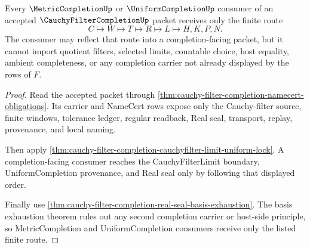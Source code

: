 \begin{theorem}
\label{thm:cauchy-filter-completion-completion-reflector-consumer}
Every $\MetricCompletionUp$ or $\UniformCompletionUp$ consumer of an accepted $\CauchyFilterCompletionUp$ packet receives only the finite route
$$
C \longmapsto W \longmapsto T \longmapsto R \longmapsto L \longmapsto H,K,P,N .
$$
The consumer may reflect that route into a completion-facing packet, but it cannot import quotient filters, selected limits, countable choice, host equality, ambient completeness, or any completion carrier not already displayed by the rows of $F$.
\end{theorem}
\begin{proof}
Read the accepted packet through \autoref{thm:cauchy-filter-completion-namecert-obligations}. Its carrier and NameCert rows expose only the Cauchy-filter source, finite windows, tolerance ledger, regular readback, Real seal, transport, replay, provenance, and local naming.

Then apply \autoref{thm:cauchy-filter-completion-cauchyfilter-limit-uniform-lock}. A completion-facing consumer reaches the CauchyFilterLimit boundary, UniformCompletion provenance, and Real seal only by following that displayed order.

Finally use \autoref{thm:cauchy-filter-completion-real-seal-basis-exhaustion}. The basis exhaustion theorem rules out any second completion carrier or host-side principle, so MetricCompletion and UniformCompletion consumers receive only the listed finite route.
\end{proof}

